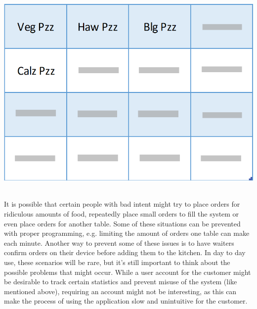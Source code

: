 \documentclass[12pt]{article}
\newenvironment{Figure}
	{\par\medskip\noindent\minipage{\linewidth}}
	{\endminipage\par\medskip}
\begin{document}
\begin{multicols}{2}
\begin{Figure}
	\includegraphics[width=\linewidth]{illustrations/waitermenu.PNG}
	\label{fig:waitercustomer}
\end{Figure}
\noindent \\It is possible that certain people with bad intent might try to place orders for ridiculous amounts of food, repeatedly place small orders to fill the system or even place orders for another table. Some of these situations can be prevented with proper programming, e.g. limiting the amount of orders one table can make each minute. Another way to prevent some of these issues is to have waiters confirm orders on their device before adding them to the kitchen. In day to day use, these scenarios will be rare, but it’s still important to think about the possible problems that might occur. While a user account for the customer might be desirable to track certain statistics and prevent misuse of the system (like mentioned above), requiring an account might not be interesting, as this can make the process of using the application slow and unintuitive for the customer.



\end{multicols}
\end{document}
